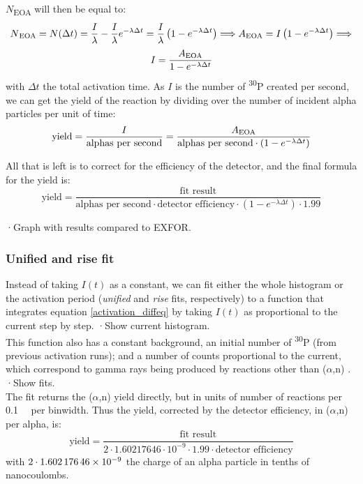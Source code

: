 \documentclass[a4paper,12pt]{report}
\newcommand{\an}{($\alpha$,n) }
\newcommand{\Piso}{\textsuperscript{30}P }
\begin{document}
$N$\textsubscript{EOA} will then be equal to:
\[ N\textsubscript{EOA} =N(\Delta t) = \frac{I}{\lambda} - \frac{I}{\lambda} e^{-\lambda \Delta t} = \frac{I}{\lambda} \left(1 - e^{-\lambda \Delta t} \right)\Longrightarrow A\textsubscript{EOA}=I\left(1-e^{-\lambda\Delta t}\right)\Longrightarrow \]
\begin{equation}
	I = \frac{A\textsubscript{EOA}}{1 - e^{-\lambda \Delta t}}
\end{equation}
with $\Delta t$ the total activation time.
As $I$ is the number of \Piso created per second, we can get the yield of the reaction by dividing over the number of incident alpha particles per unit of time:
\begin{equation}
	\text{yield} = \frac{I}{\text{alphas per second}} = \frac{A\textsubscript{EOA}}{\text{alphas per second} \cdot \left(1 - e^{-\lambda \Delta t} \right)}
\end{equation}

All that is left is to correct for the efficiency of the detector, and the final formula for the yield is:
\begin{equation}
	\text{yield} = \frac{\text{fit result}}{\text{alphas per second} \cdot \text{detector efficiency} \cdot \left(1 - e^{-\lambda \Delta t} \right) \cdot 1.99}	%
\end{equation}

·Graph with results compared to EXFOR.\\

\subsubsection{Unified and rise fit}
Instead of taking $I(t)$ as a constant, we can fit either the whole histogram or the activation period (\textit{unified} and \textit{rise} fits, respectively) to a function that integrates equation \ref{activation_diffeq} by taking $I(t)$ as proportional to the current step by step. ·Show current histogram.\\
This function also has a constant background, an initial number of \Piso (from previous activation runs); and a number of counts proportional to the current, which correspond to gamma rays being produced by reactions other than \an.	%
·Show fits.\\
The fit returns the \an yield directly, but in units of number of reactions per \qty{0.1}{\nano\Coulomb} per binwidth.
Thus the yield, corrected by the detector efficiency, in \an per alpha, is:
\begin{equation}
	\text{yield} = \frac{\text{fit result}}{2\cdot1.60217646\cdot10^{-9}\cdot 1.99 \cdot \text{detector efficiency}}
\end{equation}
with $2\cdot\num{1.60217646E-9}$ the charge of an alpha particle in tenths of nanocoulombs.
\\
\end{document}

